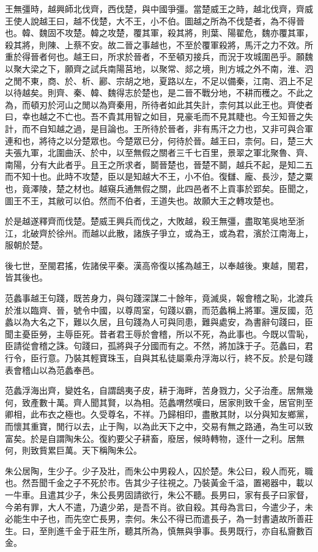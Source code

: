 王無彊時，越興師北伐齊，西伐楚，與中國爭彊。當楚威王之時，越北伐齊，齊威王使人說越王曰，越不伐楚，大不王，小不伯。圖越之所為不伐楚者，為不得晉也。韓、魏固不攻楚。韓之攻楚，覆其軍，殺其將，則葉、陽翟危，魏亦覆其軍，殺其將，則陳、上蔡不安。故二晉之事越也，不至於覆軍殺將，馬汗之力不效。所重於得晉者何也。越王曰，所求於晉者，不至頓刃接兵，而況于攻城圍邑乎。願魏以聚大梁之下，願齊之試兵南陽莒地，以聚常、郯之境，則方城之外不南，淮、泗之閒不東，商、於、析、酈、宗胡之地，夏路以左，不足以備秦，江南、泗上不足以待越矣。則齊、秦、韓、魏得志於楚也，是二晉不戰分地，不耕而穫之。不此之為，而頓刃於河山之閒以為齊秦用，所待者如此其失計，柰何其以此王也。齊使者曰，幸也越之不亡也。吾不貴其用智之如目，見豪毛而不見其睫也。今王知晉之失計，而不自知越之過，是目論也。王所待於晉者，非有馬汗之力也，又非可與合軍連和也，將待之以分楚眾也。今楚眾已分，何待於晉。越王曰，柰何。曰，楚三大夫張九軍，北圍曲沃、於中，以至無假之關者三千七百里，景翠之軍北聚魯、齊、南陽，分有大此者乎。且王之所求者，鬬晉楚也，晉楚不鬬，越兵不起，是知二五而不知十也。此時不攻楚，臣以是知越大不王，小不伯。復讎、龐、長沙，楚之粟也，竟澤陵，楚之材也。越窺兵通無假之關，此四邑者不上貢事於郢矣。臣聞之，圖王不王，其敝可以伯。然而不伯者，王道失也。故願大王之轉攻楚也。

於是越遂釋齊而伐楚。楚威王興兵而伐之，大敗越，殺王無彊，盡取笔吳地至浙江，北破齊於徐州。而越以此散，諸族子爭立，或為王，或為君，濱於江南海上，服朝於楚。

後七世，至閩君搖，佐諸侯平秦。漢高帝復以搖為越王，以奉越後。東越，閩君，皆其後也。

范蠡事越王句踐，既苦身力，與句踐深謀二十餘年，竟滅吳，報會稽之恥，北渡兵於淮以臨齊、晉，號令中國，以尊周室，句踐以霸，而范蠡稱上將軍。還反國，范蠡以為大名之下，難以久居，且句踐為人可與同患，難與處安，為書辭句踐曰，臣聞主憂臣勞，主辱臣死。昔者君王辱於會稽，所以不死，為此事也。今既以雪恥，臣請從會稽之誅。句踐曰，孤將與子分國而有之。不然，將加誅于子。范蠡曰，君行令，臣行意。乃裝其輕寶珠玉，自與其私徒屬乘舟浮海以行，終不反。於是句踐表會稽山以為范蠡奉邑。

范蠡浮海出齊，變姓名，自謂鴟夷子皮，耕于海畔，苦身戮力，父子治產。居無幾何，致產數十萬。齊人聞其賢，以為相。范蠡喟然嘆曰，居家則致千金，居官則至卿相，此布衣之極也。久受尊名，不祥。乃歸相印，盡散其財，以分與知友鄉黨，而懷其重寶，閒行以去，止于陶，以為此天下之中，交易有無之路通，為生可以致富矣。於是自謂陶朱公。復約要父子耕畜，廢居，候時轉物，逐什一之利。居無何，則致貲累巨萬。天下稱陶朱公。

朱公居陶，生少子。少子及壯，而朱公中男殺人，囚於楚。朱公曰，殺人而死，職也。然吾聞千金之子不死於市。告其少子往視之。乃裝黃金千溢，置褐器中，載以一牛車。且遣其少子，朱公長男固請欲行，朱公不聽。長男曰，家有長子曰家督，今弟有罪，大人不遣，乃遺少弟，是吾不肖。欲自殺。其母為言曰，今遣少子，未必能生中子也，而先空亡長男，柰何。朱公不得已而遣長子，為一封書遺故所善莊生。曰，至則進千金于莊生所，聽其所為，慎無與爭事。長男既行，亦自私齎數百金。

